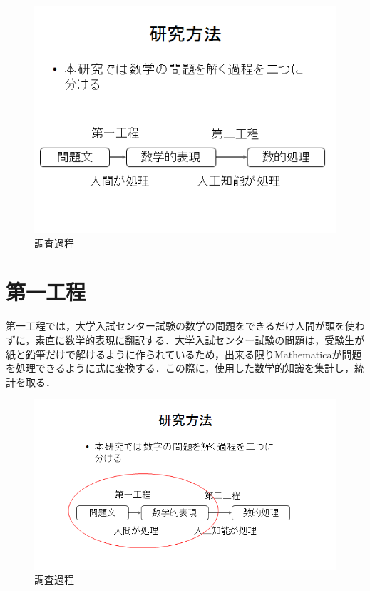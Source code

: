 \begin{figure}[h]
\centering
\includegraphics[width=15cm]{katei.png}
\caption{調査過程}\label{図}
\end{figure}

\section{第一工程}

第一工程では，大学入試センター試験の数学の問題をできるだけ人間が頭を使わずに，素直に数学的表現に翻訳する．大学入試センター試験の問題は，受験生が紙と鉛筆だけで解けるように作られているため，出来る限りMathematicaが問題を処理できるように式に変換する．この際に，使用した数学的知識を集計し，統計を取る．

\begin{figure}[h]
\centering
\includegraphics[width=15cm]{katei2.png}
\caption{調査過程}\label{図}
\end{figure}

